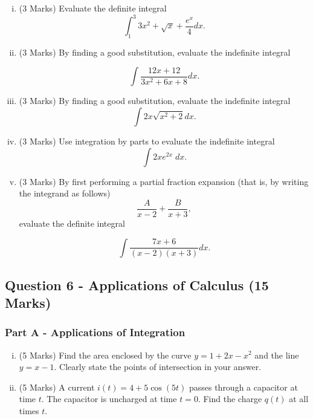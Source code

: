 ﻿ \documentclass[a4paper,12pt]{article}
\begin{document}
\begin{enumerate}[(i)]
	\item (3 Marks)  Evaluate the definite integral
	\[ \int^3_1 3x^2 + \sqrt{x} + \frac{e^x}{4} dx. \]
	\item (3 Marks) By finding a good substitution, evaluate the indefinite integral
	
	\[ \int \frac{12x + 12}{3x^2 + 6x + 8} dx.\]
	
	\item (3 Marks) By finding a good substitution, evaluate the indefinite integral
	\[ \int 2x\sqrt{x^2 + 2} dx.\]
	\item (3 Marks) Use integration by parts to evaluate the indefinite integral
	\[ \int  2xe^{2x} \;dx. \]
	\item (3 Marks) By first performing a partial fraction expansion (that is, by writing the integrand
	as follows)
	\[  \frac{A}{x - 2} + \frac{B}{x + 3},
	\]evaluate the definite integral
	
	\[ \int \frac{7x + 6}{(x -2)(x + 3)}  dx. \]
	
\end{enumerate}
\bigskip 
\newpage
\subsection*{Question 6 - Applications of Calculus (15 Marks)}

\subsubsection*{Part A - Applications of Integration}
\begin{enumerate}[(i)]
	\item (5 Marks) Find the area enclosed by the curve $y=1+2x-x^2$ and the line $y=x-1$.
	Clearly state the points of intersection in your answer.
	\smallskip
	\item (5 Marks) A current $i(t) = 4 + 5\cos(5t)$ passes through a capacitor at time $t$.
	The capacitor is uncharged at time $ t = 0 $. Find the charge $q(t)$ at all times $t$.
\end{enumerate}
\end{document}
